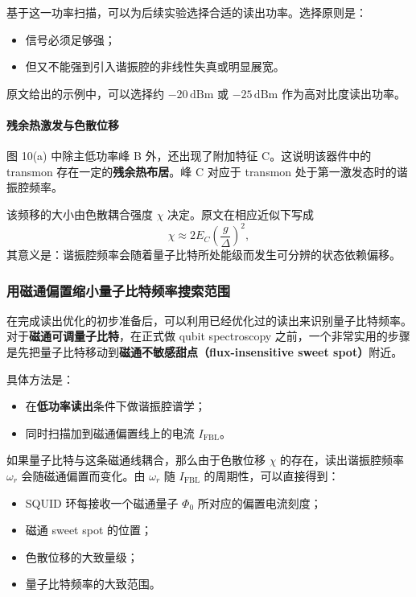 \documentclass[12pt,a4paper,oneside]{ctexbook}
\begin{document}
基于这一功率扫描，可以为后续实验选择合适的读出功率。选择原则是：
\begin{itemize}
    \item 信号必须足够强；
    \item 但又不能强到引入谐振腔的非线性失真或明显展宽。
\end{itemize}

原文给出的示例中，可以选择约 \(-20\,\mathrm{dBm}\) 或 \(-25\,\mathrm{dBm}\) 作为高对比度读出功率。

\paragraph{残余热激发与色散位移}
图 10(a) 中除主低功率峰 B 外，还出现了附加特征 C。这说明该器件中的 transmon 存在一定的\textbf{残余热布居}。峰 C 对应于 transmon 处于第一激发态时的谐振腔频率。

该频移的大小由色散耦合强度 \(\chi\) 决定。原文在相应近似下写成
\[
\chi \approx 2E_C\left(\frac{g}{\Delta}\right)^2,
\]
其意义是：谐振腔频率会随着量子比特所处能级而发生可分辨的状态依赖偏移。

\subsubsection{用磁通偏置缩小量子比特频率搜索范围}

在完成读出优化的初步准备后，可以利用已经优化过的读出来识别量子比特频率。对于\textbf{磁通可调量子比特}，在正式做 qubit spectroscopy 之前，一个非常实用的步骤是先把量子比特移动到\textbf{磁通不敏感甜点（flux-insensitive sweet spot）}附近。

具体方法是：
\begin{itemize}
    \item 在\textbf{低功率读出}条件下做谐振腔谱学；
    \item 同时扫描加到磁通偏置线上的电流 \(I_{\mathrm{FBL}}\)。
\end{itemize}

如果量子比特与这条磁通线耦合，那么由于色散位移 \(\chi\) 的存在，读出谐振腔频率 \(\omega_r\) 会随磁通偏置而变化。由 \(\omega_r\) 随 \(I_{\mathrm{FBL}}\) 的周期性，可以直接得到：
\begin{itemize}
    \item SQUID 环每接收一个磁通量子 \(\Phi_0\) 所对应的偏置电流刻度；
    \item 磁通 sweet spot 的位置；
    \item 色散位移的大致量级；
    \item 量子比特频率的大致范围。
\end{itemize}
\end{document}

